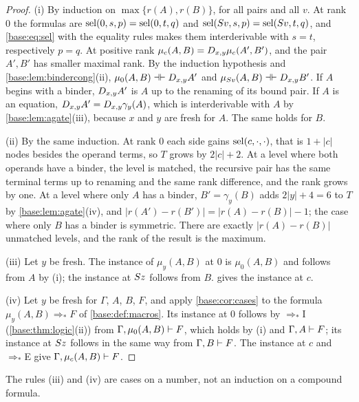 \begin{proof}
(i) By induction on $\max\{r(A),r(B)\}$, for all pairs and all $v$.  At
rank $0$ the formulas are $\operatorname{sel}(0,s,p)=\operatorname{sel}(0,t,q)$ and
$\operatorname{sel}(S v,s,p)=\operatorname{sel}(S v,t,q)$, and \eqref{base:eq:sel} with the
equality rules makes them interderivable with $s=t$, respectively $p=q$.  At
positive rank $\mu_c(A,B)=D_{x,y}\mu_c(A',B')$, and the pair $A',B'$ has
smaller maximal rank.  By the induction hypothesis and
\cref{base:lem:bindercong}(ii), $\mu_0(A,B)\dashv\vdash D_{x,y}A'$ and
$\mu_{S v}(A,B)\dashv\vdash D_{x,y}B'$.  If $A$ begins with a binder,
$D_{x,y}A'$ is $A$ up to the renaming of its bound pair.  If $A$ is an
equation, $D_{x,y}A'=D_{x,y}\gamma_y(A)$, which is interderivable with $A$
by \cref{base:lem:agate}(iii), because $x$ and $y$ are fresh for $A$.  The
same holds for $B$.

(ii) By the same induction.  At rank $0$ each side gains
$\operatorname{sel}(c,\cdot,\cdot)$, that is $1+|c|$ nodes besides the operand terms, so
$T$ grows by $2|c|+2$.  At a level where both operands have a binder, the
level is matched, the recursive pair has the same terminal terms up to
renaming and the same rank difference, and the rank grows by one.  At a
level where only $A$ has a binder, $B'=\gamma_y(B)$ adds $2|y|+4=6$ to $T$
by \cref{base:lem:agate}(iv), and $|r(A')-r(B')|=|r(A)-r(B)|-1$; the case
where only $B$ has a binder is symmetric.  There are exactly
$|r(A)-r(B)|$ unmatched levels, and the rank of the result is the maximum.

(iii) Let $y$ be fresh.  The instance of $\mu_y(A,B)$ at $0$ is
$\mu_0(A,B)$ and follows from $A$ by (i); the instance at $S z$ follows
from $B$.   gives the instance at $c$.

(iv) Let $y$ be fresh for $\Gamma$, $A$, $B$, $F$, and apply
\cref{base:cor:cases} to the formula $\mu_y(A,B)\Rightarrow_* F$ of
\cref{base:def:macros}.  Its instance at $0$ follows by $\Rightarrow_*$I
(\cref{base:thm:logic}(ii)) from $\Gamma,\mu_0(A,B)\vdash F$, which holds
by (i) and $\Gamma,A\vdash F$; its instance at $S z$ follows in the same
way from $\Gamma,B\vdash F$.  The instance at $c$ and $\Rightarrow_*$E give
$\Gamma,\mu_c(A,B)\vdash F$.
\end{proof}

The rules (iii) and (iv) are cases on a number, not an induction on a
compound formula.

